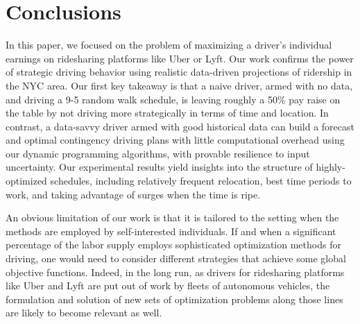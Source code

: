 
\section{Conclusions}
\label{sec:conclusions}
In this paper, we focused on the problem of 
maximizing a driver's individual earnings on ridesharing platforms like Uber or Lyft.
Our work confirms the power of strategic driving behavior %
using realistic data-driven projections
of ridership in the NYC area.  Our first key takeaway is that a naive driver,
armed with no data, and driving a 9-5 random walk schedule, is leaving 
roughly a 50\% pay raise on the table by not driving more strategically 
in terms of time and location.  In contrast, a data-savvy driver armed with
good historical data can build a forecast and optimal contingency driving plans 
with little computational overhead using 
our dynamic programming algorithms, with provable resilience to input
uncertainty.  Our experimental results yield insights into the
structure of highly-optimized schedules, including relatively frequent relocation,
best time periods to work, and taking advantage of 
surges when the time is ripe.  

An obvious limitation of our work is that it is tailored to the setting when the 
methods are employed by self-interested individuals.  If and when a 
significant percentage of the labor supply employs sophisticated optimization methods
for driving, one would need to consider different strategies that achieve some global objective functions. %
Indeed, in the long run, as drivers for ridesharing 
platforms like Uber and Lyft are put out of work by fleets of autonomous vehicles, 
the formulation and solution of new sets of optimization problems along those lines
are likely to become relevant as well.



